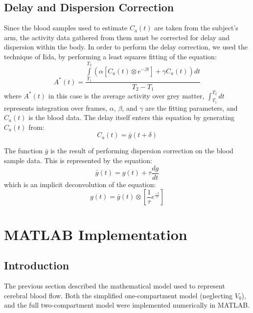 \documentclass[12pt]{article}
\begin{document}
\subsection{Delay and Dispersion Correction}
\label{sec:blood_correction}

Since the blood samples used to estimate $C_a(t)$ are taken from the
subject's arm, the activity data gathered from them must be corrected
for delay and dispersion within the body.  In order to perform the
delay correction, we used the technique of Iida, by performing a
least squares fitting of the equation:
\begin{equation}
A^{*}(t) = \frac{\int\limits_{T_1}^{T_2} \left( \alpha \left[ C_a(t) \otimes
  e^{-\beta t} \right] + \gamma C_a(t) \right) dt} {T_2 - T_1}
\label{eq:delay_correct}
\end{equation}
where $A^{*}(t)$ in this case is the average activity over grey
matter, $\int_{T_1}^{T_2}dt$ represents integration over frames,
$\alpha$, $\beta$, and $\gamma$ are the fitting parameters, and
$C_a(t)$ is the blood data.  The delay itself enters this equation by
generating $C_a(t)$ from:
\begin{equation}
C_a(t) = \bar{g}(t+\delta)
\label{eq:blood_delay}
\end{equation}

The function $\bar{g}$ is the result of performing dispersion
correction on the blood sample data.  This is represented by the
equation:
\begin{equation}
\bar{g}(t) = g(t) + \tau \frac{dg}{dt}
\label{eq:dispersion_correct}
\end{equation}
which is an implicit deconvolution of the equation:
\begin{equation}
g(t) = \bar{g}(t) \otimes \left[ \frac{1}{\tau} e^{\frac{-t}{\tau}}
\right]
\end{equation}


\newpage
\section{MATLAB Implementation}

\subsection{Introduction}

The previous section described the mathematical model used to
represent cerebral blood flow.  Both the simplified one-compartment
model (neglecting $V_0$), and the full two-compartment model were
implemented numerically in MATLAB.
\end{document}
